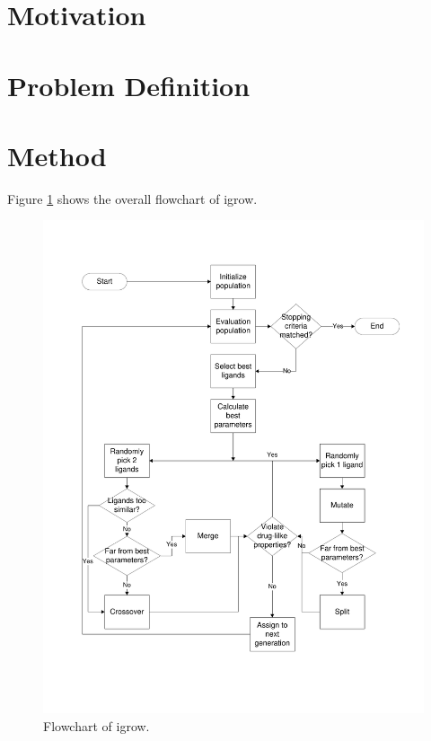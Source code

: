 \documentclass[10pt, conference, compsocconf]{IEEEtran}
\begin{document}
\section{Motivation}



\section{Problem Definition}



\section{Method}

Figure \ref{fig:Flowchart} shows the overall flowchart of igrow. 

\begin{figure}
\centering
\includegraphics[width=\linewidth]{Figures/Methods/Flowchart.pdf}
\caption{Flowchart of igrow.}
\label{fig:Flowchart}
\end{figure}
\end{document}
